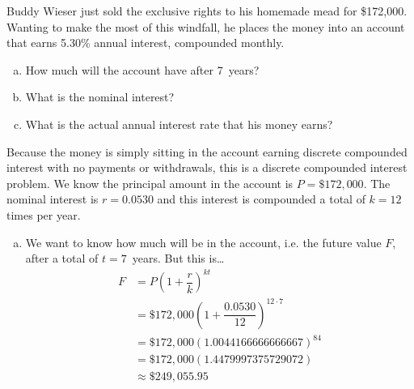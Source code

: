 \documentclass[12pt,letterpaper]{exam}
\begin{document}
\examtitle
{} 
\scores
\bottomline
\newpage


\begin{questions}

\newpage
\question[15] Buddy Wieser just sold the exclusive rights to his homemade mead for \$172,000. Wanting to make the most of this windfall, he places the money into an account that earns 5.30\% annual interest, compounded monthly. 
	\begin{enumerate}[(a)]
	\item How much will the account have after 7~years?
	\item What is the nominal interest? 
	\item What is the actual annual interest rate that his money earns?
	\end{enumerate} \pspace

\sol Because the money is simply sitting in the account earning discrete compounded interest with no payments or withdrawals, this is a discrete compounded interest problem. We know the principal amount in the account is $P= \$172,\!000$. The nominal interest is $r= 0.0530$ and this interest is compounded a total of $k= 12$ times per year. 

\begin{enumerate}[(a)]
\item We want to know how much will be in the account, i.e. the future value $F$, after a total of $t= 7$~years. But this is\dots
	\[
	\begin{aligned}
	F&= P \left(1 + \dfrac{r}{k} \right)^{kt} \\[0.3cm]
	&= \$172,\!000 \left(1 + \dfrac{0.0530}{12} \right)^{12 \cdot 7} \\[0.3cm]
	&= \$172,\!000 (1.0044166666666667)^{84} \\[0.3cm]
	&= \$172,\!000 (1.4479997375729072) \\[0.3cm]
	&\approx \$249,\!055.95
	\end{aligned}
	\] \pspace


\end{enumerate}
\end{questions}
\end{document}
